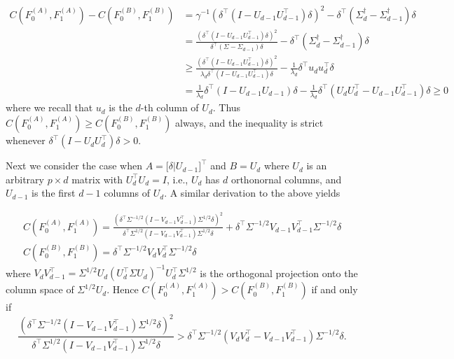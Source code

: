 \documentclass[10pt]{article}
\begin{document}
\begin{equation*}
\begin{split}
C(F_0^{(A)}, F_1^{(A)}) - C(F_0^{(B)}, F_1^{(B)}) &= \gamma^{-1} (\delta^{\top} (I - U_{d-1} U_{d-1}^{\top}) \delta)^{2} - \delta^{\top} (\Sigma_{d}^{\dagger} - \Sigma_{d-1}^{\dagger}) \delta \\ &= \frac{(\delta^{\top} (I - U_{d-1} U_{d-1}^{\top}) \delta)^{2}}{\delta^{\top} (\Sigma - \Sigma_{d-1}) \delta} - \delta^{\top} (\Sigma_{d}^{\dagger} - \Sigma_{d-1}^{\dagger}) \delta \\ &
\geq \frac{(\delta^{\top} (I - U_{d-1} U_{d-1}^{\top}) \delta)^{2}}{\lambda_d \delta^{\top} (I - U_{d-1}U_{d-1}^{\top}) \delta} - \frac{1}{\lambda_{d}} \delta^{\top} u_{d} u_{d}^{\top} \delta
\\ &= \frac{1}{\lambda_d} \delta^{\top} (I - U_{d-1}U_{d-1}) \delta - \frac{1}{\lambda_d} \delta^{\top} (U_{d} U_{d}^{\top} - U_{d-1} U_{d-1}^{\top}) \delta \geq 0
\end{split}
\end{equation*}
where we recall that $u_{d}$ is the $d$-th column of $U_{d}$. Thus $C(F_0^{(A)}, F_1^{(A)}) \geq C(F_0^{(B)}, F_1^{(B)})$ always, and the inequality is strict whenever $\delta^{\top} (I - U_{d} U_{d}^{\top}) \delta > 0$.

 Next we consider the case when $A = \bigl[ \delta | U_{d-1} \bigr]^{\top}$ and $B = U_{d}$ where $U_{d}$ is an arbitrary $p \times d$ matrix with $U_d^{\top} U_d = I$, i.e., $U_d$ has $d$ orthonornal columns, and $U_{d-1}$ is the first $d-1$ columns of $U_d$. A similar derivation to the above yields

 \begin{gather}
 C(F_0^{(A)}, F_1^{(A)}) = \frac{(\delta^{\top} \Sigma^{-1/2} (I - V_{d-1} V_{d-1}^{\top}) \Sigma^{1/2} \delta)^2}{\delta^{\top} \Sigma^{1/2} (I - V_{d-1} V_{d-1}^{\top}) \Sigma^{1/2} \delta} + \delta^{\top} \Sigma^{-1/2} V_{d-1} V_{d-1}^{\top} \Sigma^{-1/2} \delta \\
 C(F_0^{(B)}, F_1^{(B)}) = \delta^{\top} \Sigma^{-1/2} V_d V_d^{\top} \Sigma^{-1/2} \delta
 \end{gather}
 where $V_{d} V_{d-1}^{\top} = \Sigma^{1/2} U_d (U_d^{\top} \Sigma U_d)^{-1} U_d^{\top} \Sigma^{1/2}$ is the orthogonal projection onto the column space of $\Sigma^{1/2} U_d$. Hence $C(F_0^{(A)}, F_1^{(A)}) > C(F_0^{(B)}, F_1^{(B)})$ if and only if
 $$ \frac{(\delta^{\top} \Sigma^{-1/2} (I - V_{d-1} V_{d-1}^{\top}) \Sigma^{1/2} \delta)^2}{\delta^{\top} \Sigma^{1/2} (I - V_{d-1} V_{d-1}^{\top}) \Sigma^{1/2} \delta} > \delta^{\top} \Sigma^{-1/2} (V_d V_d^{\top} - V_{d-1} V_{d-1}^{\top}) \Sigma^{-1/2} \delta. $$
\end{document}

